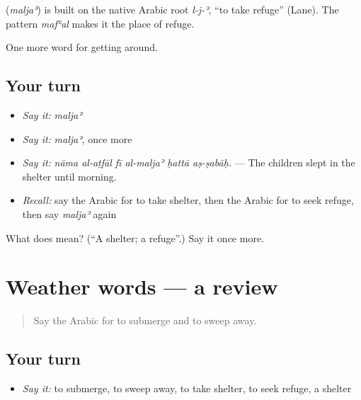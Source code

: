 \begin{cousinweb}
\textbf{} (\emph{maljaʾ}) is built on the native Arabic root \emph{l-j-ʾ}, \textquotedblleft{}to take refuge\textquotedblright{} (Lane). The pattern \emph{mafʿal} makes it the place of refuge.
\end{cousinweb}

\begin{grammarlens}[title={What you've built}]
One more word for getting around.
\end{grammarlens}

\subsection*{Your turn}
\begin{itemize}
\raggedright
  \item \emph{Say it:} \emph{maljaʾ}
  \item \emph{Say it:} \emph{maljaʾ}, once more
  \item \emph{Say it:} \emph{nāma al-aṭfāl fī al-maljaʾ ḥattā aṣ-ṣabāḥ.} — The children slept in the shelter until morning.
  \item \emph{Recall:} say the Arabic for to take shelter, then the Arabic for to seek refuge, then say \emph{maljaʾ} again
\end{itemize}

\begin{tcolorbox}[breakable,colback=teal!4,colframe=teal!35!black,title={Before you move on}]
What does  mean? (\textquotedblleft{}A shelter; a refuge\textquotedblright{}.) Say it once more.
\end{tcolorbox}
\section[(dialogue)]{Weather words — a review}

\label{lesson:AR-R487-review-487-487}



\begin{quote}
Say the Arabic for to submerge and to sweep away.
\end{quote}

\subsection*{Your turn}
\begin{itemize}
\raggedright
  \item \emph{Say it:} to submerge, to sweep away, to take shelter, to seek refuge, a shelter
\end{itemize}

